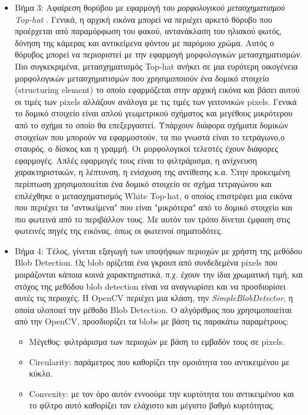 \begin{itemize}
    \item Βήμα 3: Αφαίρεση θορύβου με εφαρμογή του \emph{μορφολογικού μετασχηματισμού Top-hat} \cite{wiki:top_hat}. Γενικά, η αρχική εικόνα μπορεί να περιέχει αρκετό θόρυβο που προέρχεται από παραμόρφωση του φακού, αντανάκλαση του ηλιακού φωτός, δόνηση της κάμερας και αντικείμενα φόντου με παρόμοιο χρώμα. Αυτός ο θόρυβος μπορεί να περιοριστεί με την εφαρμογή μορφολογικών μετασχηματισμών. Πιο συγκεκριμένα, μετασχηματισμός Top-hat ανήκει σε μια ευρύτερη οικογένεια μορφολογικών μετασχηματισμών που χρησιμοποιούν ένα δομικό στοιχείο (structuring element) το οποίο εφαρμόζεται στην αρχική εικόνα και βάσει αυτού οι τιμές των pixels αλλάζουν ανάλογα με τις τιμές των γειτονικών pixels. Γενικά το δομικό στοιχείο είναι απλού γεωμετρικού σχήματος και μεγέθους μικρότερου από το σχήμα το οποίο θα επεξεργαστεί. Υπάρχουν διάφορα σχήματα δομικών στοιχείων που μπορούν να εφαρμοστούν, τα πιο γνωστά είναι το τετράγωνο,ο σταυρός, ο δίσκος και η γραμμή. Οι μορφολογικοί τελεστές έχουν διάφορες εφαρμογές. Απλές εφαρμογές τους είναι το φιλτράρισμα, η ανίχνευση χαρακτηριστικών, η λέπτυνση, η ενίσχυση της αντίθεσης κ.α. Στην προκειμένη περίπτωση χρησιμοποιείται ένα δομικό στοιχείο σε σχήμα τετραγώνου και επιλέχθηκε ο μετασχηματισμός White Top-hat, ο οποίος επιστρέφει μια εικόνα που περιέχει τα "αντικείμενα" που είναι "μικρότερα" από το δομικό στοιχείο και πιο φωτεινά από το περιβάλλον τους. Με αυτόν τον τρόπο δίνεται έμφαση στις φωτεινές πηγές της εικόνας, όπως οι φωτεινοί σηματοδότες.
    \item Βήμα 4: Τέλος, γίνεται εξαγωγή των υποψήφιων περιοχών με χρήστη της μεθόδου Blob Detection. Ως blob ορίζεται ένα γκρουπ από συνδεδεμένα pixels που μοιράζονται κάποια κοινά χαρακτηριστικά, π.χ. έχουν την ίδια χρωματική τιμή, και στόχος της μεθόδου blob detection είναι να αναγνωρίσει και να προσδιορίσει αυτές τις περιοχές. Η OpenCV περιέχει μια κλάση, την \emph{SimpleBlobDetector}, η οποία υλοποιεί την μέθοδο Blob Detection. Ο αλγόριθμος που χρησιμοποιείται από την OpenCV, προσδιορίζει τα blobs με βάση τις παρακάτω παραμέτρους:
    \begin{itemize}
        \item Μέγεθος: φιλτράρισμα των περιοχών με βάση το εμβαδόν τους σε pixels.
        \item Circularity: παράμετρος που καθορίζει την ομοιότητα του αντικειμένου με κύκλο.
        \item Convexity: με τον όρο αυτόν εννοούμε την κυρτότητα του αντικειμένου και το φίλτρο αυτό καθορίζει τον ελάχιστο και μέγιστο βαθμό κυρτότητας.

\end{itemize}
\end{itemize}
